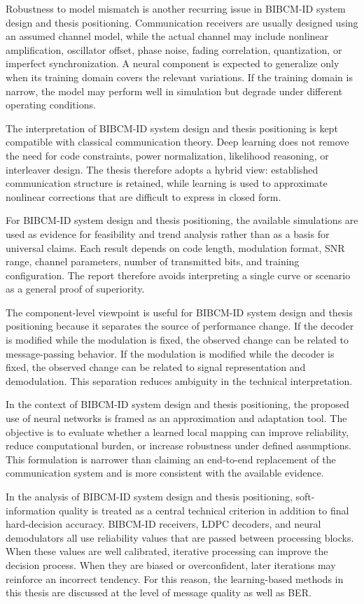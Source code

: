 Robustness to model mismatch is another recurring issue in BIBCM-ID system design and thesis positioning. Communication receivers are usually designed using an assumed channel model, while the actual channel may include nonlinear amplification, oscillator offset, phase noise, fading correlation, quantization, or imperfect synchronization. A neural component is expected to generalize only when its training domain covers the relevant variations. If the training domain is narrow, the model may perform well in simulation but degrade under different operating conditions.

The interpretation of BIBCM-ID system design and thesis positioning is kept compatible with classical communication theory. Deep learning does not remove the need for code constraints, power normalization, likelihood reasoning, or interleaver design. The thesis therefore adopts a hybrid view: established communication structure is retained, while learning is used to approximate nonlinear corrections that are difficult to express in closed form.

For BIBCM-ID system design and thesis positioning, the available simulations are used as evidence for feasibility and trend analysis rather than as a basis for universal claims. Each result depends on code length, modulation format, SNR range, channel parameters, number of transmitted bits, and training configuration. The report therefore avoids interpreting a single curve or scenario as a general proof of superiority.

The component-level viewpoint is useful for BIBCM-ID system design and thesis positioning because it separates the source of performance change. If the decoder is modified while the modulation is fixed, the observed change can be related to message-passing behavior. If the modulation is modified while the decoder is fixed, the observed change can be related to signal representation and demodulation. This separation reduces ambiguity in the technical interpretation.

In the context of BIBCM-ID system design and thesis positioning, the proposed use of neural networks is framed as an approximation and adaptation tool. The objective is to evaluate whether a learned local mapping can improve reliability, reduce computational burden, or increase robustness under defined assumptions. This formulation is narrower than claiming an end-to-end replacement of the communication system and is more consistent with the available evidence.

In the analysis of BIBCM-ID system design and thesis positioning, soft-information quality is treated as a central technical criterion in addition to final hard-decision accuracy. BIBCM-ID receivers, LDPC decoders, and neural demodulators all use reliability values that are passed between processing blocks. When these values are well calibrated, iterative processing can improve the decision process. When they are biased or overconfident, later iterations may reinforce an incorrect tendency. For this reason, the learning-based methods in this thesis are discussed at the level of message quality as well as BER.


